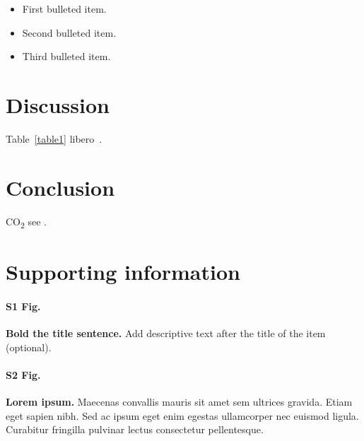 \documentclass[10pt,letterpaper]{article}
\begin{document}
\begin{itemize}
	\item First bulleted item.
	\item Second bulleted item.
	\item Third bulleted item.
\end{itemize}

\section*{Discussion}
Table~\ref{table1} libero~\cite{bib3}.

\section*{Conclusion}

CO\textsubscript{2} see .

\cite{Akram2014}
\cite{Atanassov1986}
\cite{Boer-Sorban2008}
\cite{Castillo2017}
\cite{Chen2001}
\cite{Cornelis2004}
\cite{De2001}
\cite{Dengfeng2002}
\cite{Deschrijver2004}
\cite{Despi2013}
\cite{Hernandez-Aguila2017}
\cite{Hernandez-Aguila2017-2}
\cite{Hernandez-Aguila2016}
\cite{Homaifar1995}
\cite{Huang2009}
\cite{Jennings2001}
\cite{Keen1980}
\cite{Mamdani1975}
\cite{Niazi2011}
\cite{Own2009}
\cite{Szmidt2001}
\cite{Takagi1985}
\cite{Thrift1991}
\cite{Tsang2004}
\cite{Vora2011}
\cite{Wagner2013}
\cite{Xu2007}
\cite{Zadeh1965}

\section*{Supporting information}

\paragraph*{S1 Fig.}
\label{S1_Fig}
{\bf Bold the title sentence.} Add descriptive text after the title of the item (optional).

\paragraph*{S2 Fig.}
\label{S2_Fig}
{\bf Lorem ipsum.} Maecenas convallis mauris sit amet sem ultrices gravida. Etiam eget sapien nibh. Sed ac ipsum eget enim egestas ullamcorper nec euismod ligula. Curabitur fringilla pulvinar lectus consectetur pellentesque.
\end{document}
